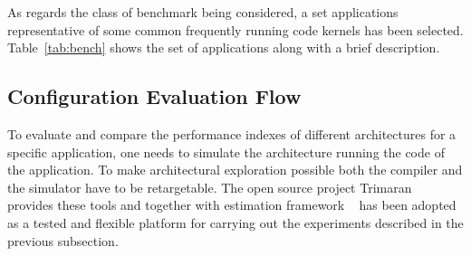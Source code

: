 As regards the class of benchmark being considered, a set applications representative of some common
frequently running code kernels has been selected. Table~\ref{tab:bench} shows the set of applications
along with a brief description.

\begin{table}
\end{table}

\subsection{Configuration Evaluation Flow}

To evaluate and compare the performance indexes of different
architectures for a specific application, one needs to simulate the
architecture running the code of the application. To make
architectural exploration possible both the compiler and the simulator
have to be retargetable. The open source project Trimaran~\cite{trimaran_hp} provides these
tools and together with estimation framework \ee~\cite{palpatti_estimedia03} has been
adopted as a tested and flexible platform for carrying out the
experiments described in the previous subsection.

